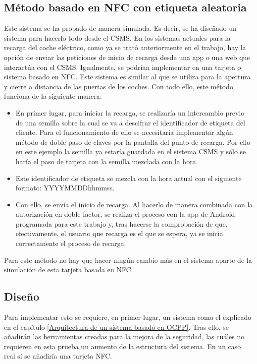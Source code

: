 \documentclass[12pt,a4paper,onecolumn,oneside]{report}
\begin{document}
\subsection{Método basado en NFC con etiqueta aleatoria}

Este sistema se ha probado de manera simulada. Es decir, se ha diseñado un sistema para hacerlo todo desde el CSMS. En los sistemas actuales para la recarga del coche eléctrico, como ya se trató anteriormente en el trabajo, hay la opción de enviar las peticiones de inicio de recarga desde una app o una web que interactúa con el CSMS. Igualmente, se podrían implementar en una tarjeta o sistema basado en NFC. Este sistema es similar al que se utiliza para la apertura y cierre a distancia de las puertas de los coches. Con todo ello, este método funciona de la siguiente manera:

\begin{itemize}
\item En primer lugar, para iniciar la recarga, se realizaría un intercambio previo de una semilla sobre la cual se va a descifrar el identificador de etiqueta del cliente. Para el funcionamiento de ello se necesitaría implementar algún método de doble paso de claves por la pantalla del punto de recarga. Por ello en este ejemplo la semilla ya estaría guardada en el sistema CSMS y sólo se haría el paso de tarjeta con la semilla mezclada con la hora.
\item Este identificador de etiqueta se mezcla con la hora actual con el siguiente formato: YYYYMMDDhhmmss.
\item Con ello, se envía el inicio de recarga. Al hacerlo de manera combinada con la autorización en doble factor, se realiza el proceso con la app de Android programada para este trabajo y, tras hacerse la comprobación de que, efectivamente, el usuario que recarga es el que se espera, ya se inicia correctamente el proceso de recarga.
\end{itemize}

Para este método no hay que hacer ningún cambio más en el sistema aparte de la simulación de esta tarjeta basada en NFC.



\subsection{Diseño}

Para implementar esto se requiere, en primer lugar, un sistema como el explicado en el capítulo \ref{Arquitectura de un sistema basado en OCPP}. Tras ello, se añadirán las herramientas creadas para la mejora de la seguridad, las cuáles no requieren en esta prueba un aumento de la estructura del sistema. En un caso real sí se añadiría una tarjeta NFC.
\end{document}
